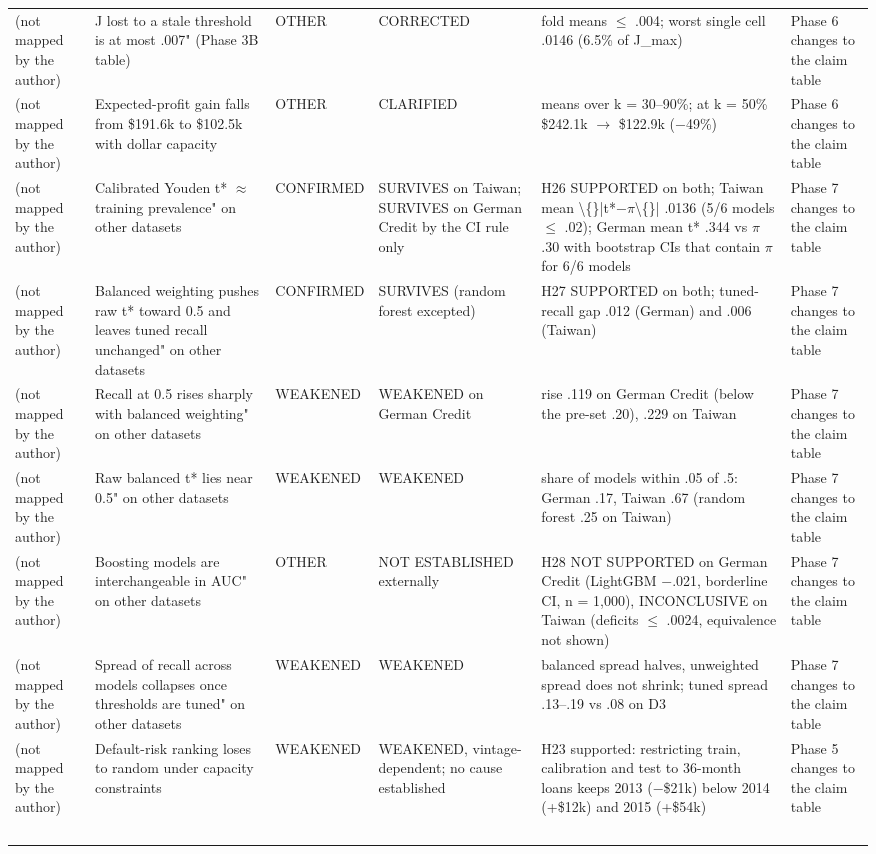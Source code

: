 \begin{tabular}{lp{5.2cm}lp{5.2cm}p{5.2cm}p{5.2cm}}
(not mapped by the author) & J lost to a stale threshold is at most .007" (Phase 3B table) & OTHER & CORRECTED & fold means $\leq$ .004; worst single cell .0146 (6.5\% of J\_max) & Phase 6 changes to the claim table \\
(not mapped by the author) & Expected-profit gain falls from \$191.6k to \$102.5k with dollar capacity & OTHER & CLARIFIED & means over k = 30--90\%; at k = 50\% \$242.1k $\to$ \$122.9k ($-$49\%) & Phase 6 changes to the claim table \\
(not mapped by the author) & Calibrated Youden t* $\approx$ training prevalence" on other datasets & CONFIRMED & SURVIVES on Taiwan; SURVIVES on German Credit by the CI rule only & H26 SUPPORTED on both; Taiwan mean \textbackslash\{\}|t*$-$$\pi$\textbackslash\{\}| .0136 (5/6 models $\leq$ .02); German mean t* .344 vs $\pi$ .30 with bootstrap CIs that contain $\pi$ for 6/6 models & Phase 7 changes to the claim table \\
(not mapped by the author) & Balanced weighting pushes raw t* toward 0.5 and leaves tuned recall unchanged" on other datasets & CONFIRMED & SURVIVES (random forest excepted) & H27 SUPPORTED on both; tuned-recall gap .012 (German) and .006 (Taiwan) & Phase 7 changes to the claim table \\
(not mapped by the author) & Recall at 0.5 rises sharply with balanced weighting" on other datasets & WEAKENED & WEAKENED on German Credit & rise .119 on German Credit (below the pre-set .20), .229 on Taiwan & Phase 7 changes to the claim table \\
(not mapped by the author) & Raw balanced t* lies near 0.5" on other datasets & WEAKENED & WEAKENED & share of models within .05 of .5: German .17, Taiwan .67 (random forest .25 on Taiwan) & Phase 7 changes to the claim table \\
(not mapped by the author) & Boosting models are interchangeable in AUC" on other datasets & OTHER & NOT ESTABLISHED externally & H28 NOT SUPPORTED on German Credit (LightGBM $-$.021, borderline CI, n = 1,000), INCONCLUSIVE on Taiwan (deficits $\leq$ .0024, equivalence not shown) & Phase 7 changes to the claim table \\
(not mapped by the author) & Spread of recall across models collapses once thresholds are tuned" on other datasets & WEAKENED & WEAKENED & balanced spread halves, unweighted spread does not shrink; tuned spread .13--.19 vs .08 on D3 & Phase 7 changes to the claim table \\
(not mapped by the author) & Default-risk ranking loses to random under capacity constraints & WEAKENED & WEAKENED, vintage-dependent; no cause established & H23 supported: restricting train, calibration and test to 36-month loans keeps 2013 ($-$\$21k) below 2014 (+\$12k) and 2015 (+\$54k) & Phase 5 changes to the claim table \\
$$
\end{tabular}
